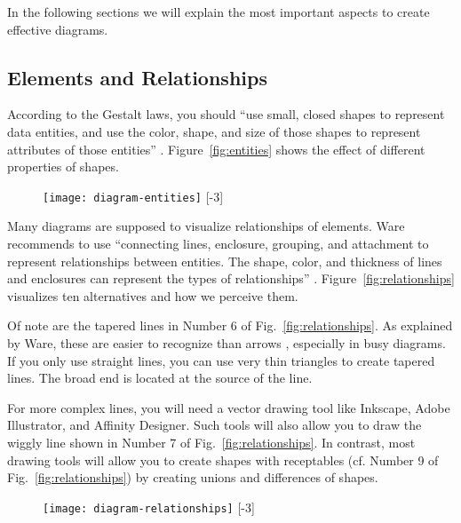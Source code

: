 In the following sections we will explain the most important aspects to create effective diagrams.

\subsection{Elements and Relationships}

According to the Gestalt laws, you should
``use small, closed shapes to represent data entities, and use the color, shape, and size of those shapes to represent attributes of those entities'' \cite{Ware12}. Figure~\ref{fig:entities} shows the effect of different properties of shapes.

\begin{figure}[t]
\centering
\texttt{[image: diagram-entities]}
[-3\baselineskip]
\end{figure}

Many diagrams are supposed to visualize relationships of elements. Ware recommends to use ``connecting lines, enclosure, grouping, and attachment to represent relationships between entities. The shape, color, and thickness of lines and enclosures can represent the types of relationships'' \cite{Ware12}. Figure~\ref{fig:relationships} visualizes ten alternatives and how we perceive them.

Of note are the tapered lines in Number 6 of Fig.~\ref{fig:relationships}. As explained by Ware, these are easier to recognize than arrows \cite{Ware12}, especially in busy diagrams. If you only use straight lines, you can use very thin triangles to create tapered lines. The broad end is located at the source of the line.

For more complex lines, you will need a vector drawing tool like Inkscape, Adobe Illustrator, and Affinity Designer. Such tools will also allow you to draw the wiggly line shown in Number 7 of Fig.~\ref{fig:relationships}. In contrast, most drawing tools will allow you to create shapes with receptables (cf. Number 9 of Fig.~\ref{fig:relationships}) by creating unions and differences of shapes.



\begin{figure}[t]
\centering
\texttt{[image: diagram-relationships]}
[-3\baselineskip]
\end{figure}



